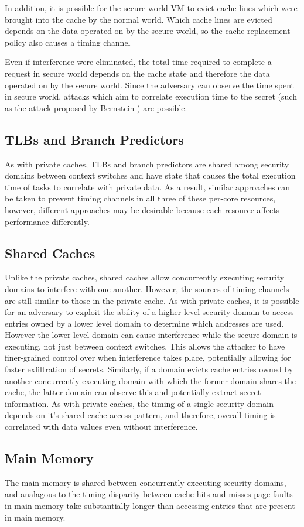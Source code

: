In addition, it is possible for the secure world VM to evict cache lines which 
were brought into the cache by the normal world.  Which cache lines are evicted 
depends on the data operated on by the secure world, so the cache replacement 
policy also causes a timing channel

Even if interference were eliminated, the total time required to complete a 
request in secure world depends on the cache state and therefore the data 
operated on by the secure world. Since the adversary can observe the time spent 
in secure world, attacks which aim to correlate execution time to the secret 
(such as the attack proposed by Bernstein \cite{bernstein}) are possible.

\subsection{TLBs and Branch Predictors}
As with private caches, TLBs and branch predictors are shared among security 
domains between context switches and have state that causes the total execution 
time of tasks to correlate with private data. As a result, similar approaches 
can be taken to prevent timing channels in all three of these per-core 
resources, however, different approaches may be desirable because each resource 
affects performance differently.

\subsection{Shared Caches}
Unlike the private caches, shared caches allow concurrently executing security 
domains to interfere with one another. However, the sources of timing channels 
are still similar to those in the private cache. As with private caches, it is 
possible for an adversary to exploit the ability of a higher level security 
domain to access entries owned by a lower level domain to determine which 
addresses are used. However the lower level domain can cause interference while 
the secure domain is executing, not just between context switches. This allows 
the attacker to have finer-grained control over when interference takes place, 
potentially allowing for faster exfiltration of secrets. Similarly, if a domain 
evicts cache entries owned by another concurrently executing domain with which 
the former domain shares the cache, the latter domain can observe this and 
potentially extract secret information. As with private caches, the timing of a 
single security domain depends on it's shared cache access pattern, and 
therefore, overall timing is correlated with data values even without 
interference.

\subsection{Main Memory}
The main memory is shared between concurrently executing security domains, and 
analagous to the timing disparity between cache hits and misses page faults in 
main memory take substantially longer than accessing entries that are present 
in main memory. 
